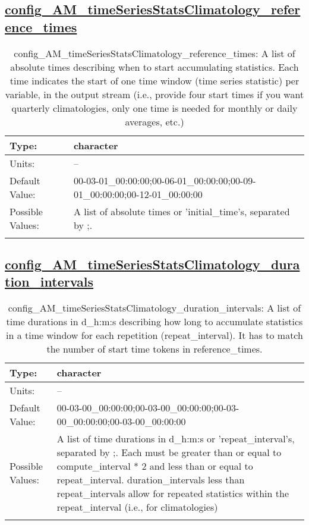 \subsection[config\_AM\_timeSeriesStatsClimatology\_reference\_times]{\hyperref[sec:nm_tab_AM_timeSeriesStatsClimatology]{config\_AM\_timeSeriesStatsClimatology\_reference\_times}}
\label{subsec:nm_sec_config_AM_timeSeriesStatsClimatology_reference_times}
\begin{center}
\begin{longtable}{| p{2.0in} || p{4.0in} |}
    \hline
    Type: & character \\
    \hline
    Units: & -- \\
    \hline
    Default Value: & 00-03-01\_00:00:00;00-06-01\_00:00:00;00-09-01\_00:00:00;00-12-01\_00:00:00 \\
    \hline
    Possible Values: & A list of absolute times or 'initial\_time's, separated by ;. \\
    \hline
    \caption{config\_AM\_timeSeriesStatsClimatology\_reference\_times: A list of absolute times describing when to start accumulating statistics. Each time indicates the start of one time window (time series statistic) per variable, in the output stream (i.e., provide four start times if you want quarterly climatologies, only one time is needed for monthly or daily averages, etc.)}
\end{longtable}
\end{center}
\subsection[config\_AM\_timeSeriesStatsClimatology\_duration\_intervals]{\hyperref[sec:nm_tab_AM_timeSeriesStatsClimatology]{config\_AM\_timeSeriesStatsClimatology\_duration\_intervals}}
\label{subsec:nm_sec_config_AM_timeSeriesStatsClimatology_duration_intervals}
\begin{center}
\begin{longtable}{| p{2.0in} || p{4.0in} |}
    \hline
    Type: & character \\
    \hline
    Units: & -- \\
    \hline
    Default Value: & 00-03-00\_00:00:00;00-03-00\_00:00:00;00-03-00\_00:00:00;00-03-00\_00:00:00 \\
    \hline
    Possible Values: & A list of time durations in d\_h:m:s or 'repeat\_interval's, separated by ;. Each must be greater than or equal to compute\_interval * 2 and less than or equal to repeat\_interval. duration\_intervals less than repeat\_intervals allow for repeated statistics within the repeat\_interval (i.e., for climatologies) \\
    \hline
    \caption{config\_AM\_timeSeriesStatsClimatology\_duration\_intervals: A list of time durations in d\_h:m:s describing how long to accumulate statistics in a time window for each repetition (repeat\_interval). It has to match the number of start time tokens in reference\_times.}
\end{longtable}
\end{center}
